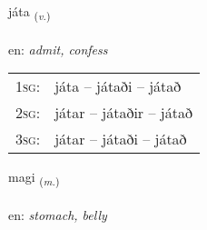 \documentclass[frontgrid, backgrid]{flacards}\usepackage[]{graphicx}\usepackage[]{color}
\begin{document}
\renewcommand{\blhead}{\vskip5pt {\small\bfseries\footnotesize Sagnorð | Verb }}
\renewcommand{\bcfoot}{\vskip5pt \hspace{2pt}{\small\bfseries\footnotesize 2K}}


{játa \small{\textsubscript{(\textit{v.})}} \\[1ex] %
\textphonetic{[jauːta]} \\
en: \emph{admit, confess} \\  [2ex]
\renewcommand*{\arraystretch}{0.8}
\begin{tabular}{p{1cm}l}
\textsc{1sg}: & játa -- játaði -- játað \\ 
\textsc{2sg}: & játar -- játaðir -- játað \\ 
\textsc{3sg}: & játar -- játaði -- játað \\ 
\end{tabular}
}

\renewcommand{\flhead}{\vskip5pt \fboxsep=0pt {\small\bfseries\footnotesize Nafnorð | Noun}}
\renewcommand{\fcfoot}{\vskip5pt \fboxsep=0pt \hspace{2pt}{\small\bfseries\footnotesize 2K}}

\renewcommand{\blhead}{\vskip5pt {\small\bfseries\footnotesize Nafnorð | Noun }}
\renewcommand{\bcfoot}{\vskip5pt \hspace{2pt}{\small\bfseries\footnotesize 2K}}


{magi \small{\textsubscript{(\textit{m.})}} \\[1ex] %
\textphonetic{[maijɪ]} \\
en: \emph{stomach, belly} \\  [2ex]
\renewcommand*{\arraystretch}{0.8}
}

\renewcommand{\flhead}{\vskip5pt \fboxsep=0pt {\small\bfseries\footnotesize Nafnorð | Noun}}
\renewcommand{\fcfoot}{\vskip5pt \fboxsep=0pt \hspace{2pt}{\small\bfseries\footnotesize 2K}}
\end{document}
